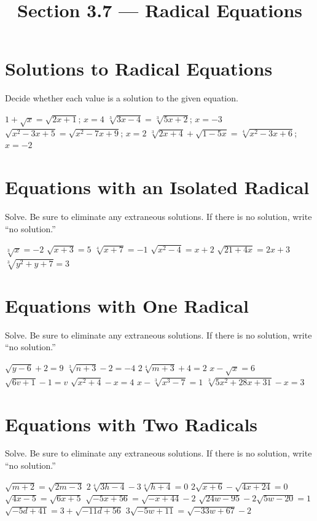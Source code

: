 

\title{Section 3.7 --- Radical Equations}


\maketitle

\section*{Solutions to Radical Equations}
Decide whether each value is a solution to the given equation.
\begin{smenum}
\mitemxx
{$1+\sqrt{x}=\sqrt{2x+1}$; $x=4$}
{$\sqrt[3]{3x-4}=\sqrt[3]{5x+2}$; $x=-3$}
\mitemxx
{$\sqrt{x^2-3x+5}=\sqrt{x^2-7x+9}$; $x=2$}
{$\sqrt[3]{2x+4}+\sqrt{1-5x}=\sqrt[4]{x^2-3x+6}$; $x=-2$}
\end{smenum}

\section*{Equations with an Isolated Radical}
Solve.  Be sure to eliminate any extraneous solutions. If there is no solution, write ``no solution.''
\begin{smenum}
\mitemxxx
{$\sqrt[3]{x}=-2$}
{$\sqrt{x+3}=5$}
{$\sqrt[4]{x+7}=-1$}
\mitemxxx
{$\sqrt{x^2-4}=x+2$}
{$\sqrt{21+4x}=2x+3$}
{$\sqrt[3]{y^2+y+7}=3$}
\end{smenum}

\section*{Equations with One Radical}
Solve.  Be sure to eliminate any extraneous solutions. If there is no solution, write ``no solution.''
\begin{smenum}
\mitemxxx
{$\sqrt{y-6}+2=9$}
{$\sqrt[3]{n+3}-2=-4$}
{$2\sqrt[4]{m+3}+4=2$}
\mitemxxx
{$x-\sqrt{x}=6$}
{$\sqrt{6v+1}-1=v$}
{$\sqrt{x^2+4}-x=4$}
\mitemxx
{$x-\sqrt[3]{x^3-7}=1$}
{$\sqrt[3]{5x^2+28x+31}-x=3$}
\end{smenum}

\section*{Equations with Two Radicals}
Solve.  Be sure to eliminate any extraneous solutions. If there is no solution, write ``no solution.''
\begin{smenum}
\mitemxx
{$\sqrt{m+2}=\sqrt{2m-3}$}
{$2\sqrt[4]{3h-4}-3\sqrt[4]{h+4}=0$}
\mitemxx
{$2\sqrt{x+6}-\sqrt{4x+24}=0$}
{$\sqrt{4x-5}=\sqrt{6x+5}$}
\mitemxx
{$\sqrt{-5x+56}=\sqrt{-x+44}-2$}
{$\sqrt{24w-95}-2\sqrt{5w-20}=1$}
\mitemxx
{$\sqrt{-5d+41}=3+\sqrt{-11d+56}$}
{$3\sqrt{-5w+11}=\sqrt{-33w+67}-2$}
\end{smenum}


